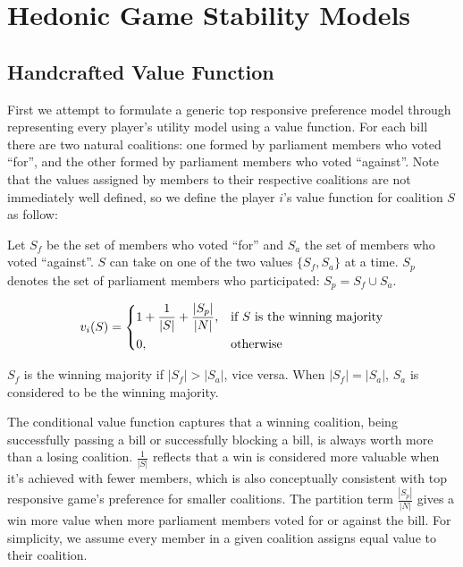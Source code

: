 
\chapter{Hedonic Game Stability Models}
\label{ch:hedonic}
\vspace{2em}

\section{Handcrafted Value Function}

First we attempt to formulate a generic top responsive preference model
through representing every player's utility model using a value function.
For each bill there are two natural coalitions:
one formed by parliament members who voted ``for'',
and the other formed by parliament members who voted ``against''.
Note that the values assigned by members to their respective coalitions
are not immediately well defined,
so we define the player $i$'s value function for coalition $S$ as follow:

Let $S_f$ be the set of members who voted ``for'' and
$S_a$ the set of members who voted ``against''.
$S$ can take on one of the two values $\{S_f, S_a\}$ at a time.
$S_p$ denotes the set of parliament members who participated: $S_p = S_f \cup S_a$.

\[
  v_i(S) =
  \begin{dcases}
      1 + \frac{1}{|S|} + \frac{|S_p|}{|N|},& \text{if $S$ is the winning majority}\\
      0,              & \text{otherwise}
  \end{dcases}
\]

$S_f$ is the winning majority if $|S_f| > |S_a|$, vice versa. When $|S_f| = |S_a|$, $S_a$ is considered to be the winning majority.

The conditional value function captures that a winning coalition,
being successfully passing a bill or successfully blocking a bill,
is always worth more than a losing coalition.
$\frac{1}{|S|}$ reflects that a win is considered more valuable when it's
achieved with fewer members, which is also conceptually consistent with
top responsive game's preference for smaller coalitions.
The partition term $\frac{|S_p|}{|N|}$ gives a win more value when more
parliament members voted for or against the bill.
For simplicity, we assume every member in a given coalition assigns
equal value to their coalition.


